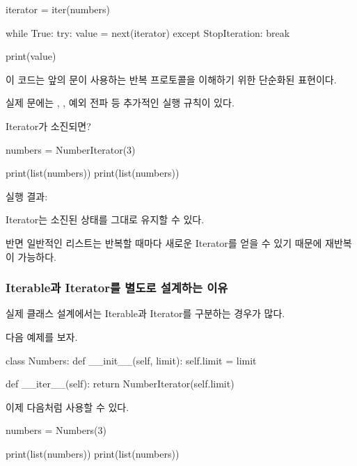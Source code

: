 \begin{dhkcode}
iterator = iter(numbers)

while True:
    try:
        value = next(iterator)
    except StopIteration:
        break

    print(value)
\end{dhkcode}

이 코드는 앞의  문이 사용하는 반복 프로토콜을 이해하기 위한 단순화된 표현이다.

실제 문에는 , , 예외 전파 등 추가적인 실행 규칙이 있다.

\begin{dhknote}
\begin{dhksmry}[centered]
Iterator가 소진되면?
\end{dhksmry}
\end{dhknote}

\begin{dhkcode}
numbers = NumberIterator(3)

print(list(numbers))
print(list(numbers))
\end{dhkcode}

실행 결과:

\begin{dhkzsh}
[0, 1, 2]
[]
\end{dhkzsh}

Iterator는 소진된 상태를 그대로 유지할 수 있다.

반면 일반적인 리스트는 반복할 때마다 새로운 Iterator를 얻을 수 있기 때문에 재반복이 가능하다.

\subsubsection{Iterable과 Iterator를 별도로 설계하는 이유}

실제 클래스 설계에서는 Iterable과 Iterator를 구분하는 경우가 많다.

다음 예제를 보자.

\begin{dhkcode}
class Numbers:
    def __init__(self, limit):
        self.limit = limit

    def __iter__(self):
        return NumberIterator(self.limit)
\end{dhkcode}

이제 다음처럼 사용할 수 있다.

\begin{dhkcode}
numbers = Numbers(3)

print(list(numbers))
print(list(numbers))
\end{dhkcode}

